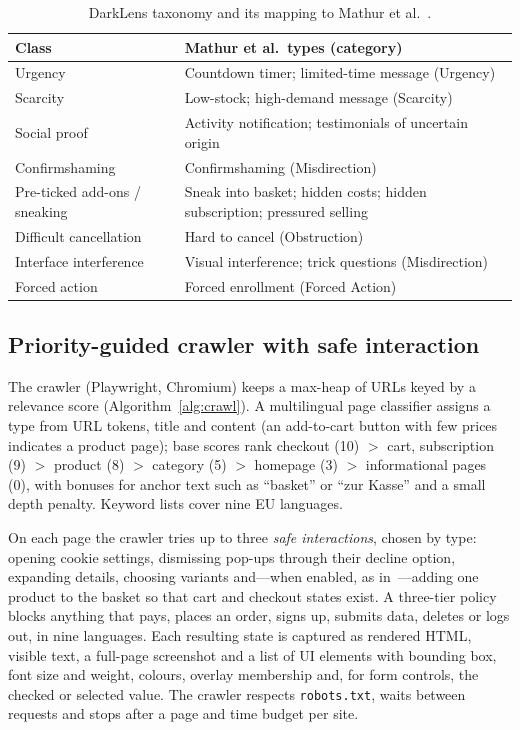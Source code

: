 \documentclass[conference]{IEEEtran}
\begin{document}
\begin{table}[t]
\centering
\caption{DarkLens taxonomy and its mapping to Mathur et al.~\cite{mathur2019}.}
\label{tab:tax}
\footnotesize
\begin{tabular}{p{2.1cm}p{5.6cm}}
\toprule
Class & Mathur et al.\ types (category) \\
\midrule
Urgency & Countdown timer; limited-time message (Urgency) \\
Scarcity & Low-stock; high-demand message (Scarcity) \\
Social proof & Activity notification; testimonials of uncertain origin \\
Confirmshaming & Confirmshaming (Misdirection) \\
Pre-ticked add-ons / sneaking & Sneak into basket; hidden costs; hidden subscription; pressured selling \\
Difficult cancellation & Hard to cancel (Obstruction) \\
Interface interference & Visual interference; trick questions (Misdirection) \\
Forced action & Forced enrollment (Forced Action) \\
\bottomrule
\end{tabular}
\end{table}

\subsection{Priority-guided crawler with safe interaction}
The crawler (Playwright, Chromium) keeps a max-heap of URLs keyed by a relevance score
(Algorithm~\ref{alg:crawl}). A multilingual page classifier assigns a type from URL tokens, title and
content (an add-to-cart button with few prices indicates a product page); base scores rank checkout (10)
$>$ cart, subscription (9) $>$ product (8) $>$ category (5) $>$ homepage (3) $>$ informational pages (0),
with bonuses for anchor text such as ``basket'' or ``zur Kasse'' and a small depth penalty. Keyword lists
cover nine EU languages.

On each page the crawler tries up to three \emph{safe interactions}, chosen by type: opening cookie
settings, dismissing pop-ups through their decline option, expanding details, choosing variants and---when
enabled, as in~\cite{mathur2019}---adding one product to the basket so that cart and checkout states exist.
A three-tier policy blocks anything that pays, places an order, signs up, submits data, deletes or logs
out, in nine languages. Each resulting state is captured as rendered HTML, visible text, a full-page
screenshot and a list of UI elements with bounding box, font size and weight, colours, overlay membership
and, for form controls, the checked or selected value. The crawler respects \texttt{robots.txt}, waits
between requests and stops after a page and time budget per site.
\end{document}
